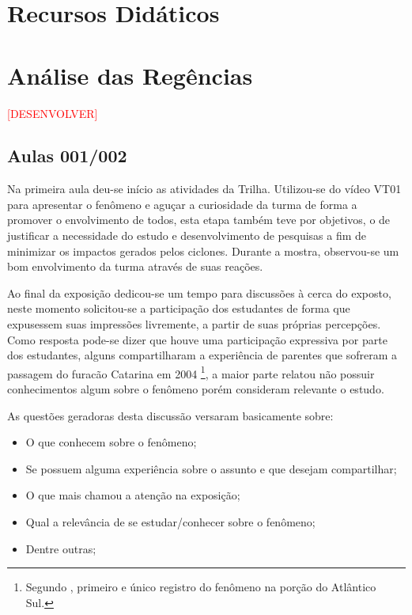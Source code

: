 \section{Recursos Didáticos} %
\label{sec:Recursos Didáticos}

\section{Análise das Regências} %
\label{sec:Análise das Regências}

\textcolor{red}{[DESENVOLVER]}

\subsection{Aulas 001/002} %
\label{sub:Aulas 001/002}
Na primeira aula deu-se início as atividades da Trilha. Utilizou-se do vídeo VT01 para apresentar o fenômeno e aguçar a curiosidade da turma de forma a promover o envolvimento de todos, esta etapa também teve por objetivos, o de justificar a necessidade do estudo e desenvolvimento de pesquisas a fim de minimizar os impactos gerados pelos ciclones. Durante a mostra, observou-se um bom envolvimento da turma através de suas reações.

Ao final da exposição dedicou-se um tempo para discussões à cerca do exposto, neste momento solicitou-se a participação dos estudantes de forma que expusessem suas impressões livremente, a partir de suas próprias percepções. Como resposta pode-se dizer que houve uma participação expressiva por parte dos estudantes, alguns compartilharam a experiência de parentes que sofreram a passagem do furacão Catarina em 2004 \footnote{Segundo \cite{PEZZA:2005}, primeiro e único registro do fenômeno na porção do Atlântico Sul.}, a maior parte relatou não possuir conhecimentos algum sobre o fenômeno porém consideram relevante o estudo.

As questões geradoras desta discussão versaram basicamente sobre:

\begin{itemize}
	\item O que conhecem sobre o fenômeno;
	\item Se possuem alguma experiência sobre o assunto e que desejam compartilhar;
	\item O que mais chamou a atenção na exposição;
	\item Qual a relevância de se estudar/conhecer sobre o fenômeno;
	\item Dentre outras;
\end{itemize}



